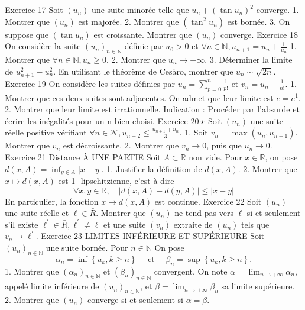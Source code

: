\documentclass[a4paper,11pt]{article}
\theoremstyle{definition}
\begin{document}
Exercice 17 Soit $\left(u_n\right)$ une suite minorée telle que $u_n+\left(\tan u_n\right)^2$ converge.
1. Montrer que $\left(u_n\right)$ est majorée.
2. Montrer que $\left(\tan ^2 u_n\right)$ est bornée.
3. On suppose que $\left(\tan u_n\right)$ est croissante. Montrer que $\left(u_n\right)$ converge.
Exercice 18 On considère la suite $\left(u_n\right)_{n \in \mathbb{N}}$ définie par $u_0>0$ et $\forall n \in \mathbb{N}, u_{n+1}=u_n+\frac{1}{u_n}$
1. Montrer que $\forall n \in \mathbb{N}, u_n \geq 0$.
2. Montrer que $u_n \rightarrow+\infty$.
3. Déterminer la limite de $u_{n+1}^2-u_n^2$. En utilisant le théorème de Cesàro, montrer que $u_n \sim \sqrt{2 n}$.
Exercice 19 On considère les suites définies par $u_n=\sum_{p=0}^n \frac{1}{p !}$ et $v_n=u_n+\frac{1}{n !}$.
1. Montrer que ces deux suites sont adjacentes.
On admet que leur limite est $e=e^1$.
2. Montrer que leur limite est irrationnelle.
Indication : Procéder par l'absurde et écrire les inégalités pour un n bien choisi.
Exercice $20 \star \operatorname{Soit}\left(u_n\right)$ une suite réelle positive vérifiant $\forall n \in \mathcal{N}, u_{n+2} \leq \frac{u_{n+1}+u_n}{3}$.
1. Soit $v_n=\max \left(u_n, u_{n+1}\right)$. Montrer que $v_n$ est décroissante.
2. Montrer que $v_n \rightarrow 0$, puis que $u_n \rightarrow 0$.
Exercice 21 Distance À UNE PARTIE Soit $A \subset \mathbb{R}$ non vide. Pour $x \in \mathbb{R}$, on pose $d(x, A)=\inf _{y \in A}|x-y|$.
1. Justifier la définition de $d(x, A)$.
2. Montrer que $x \mapsto d(x, A)$ est 1 -lipschitzienne, c'est-à-dire
$$
\forall x, y \in \mathbb{R}, \quad|d(x, A)-d(y, A)| \leq|x-y|
$$
En particulier, la fonction $x \mapsto d(x, A)$ est continue.
Exercice 22 Soit $\left(u_n\right)$ une suite réelle et $\ell \in \bar{R}$. Montrer que $\left(u_n\right)$ ne tend pas vers $\ell$ si et seulement s'il existe $\ell^{\prime} \in \bar{R}, \ell^{\prime} \neq \ell$ et une suite $\left(v_n\right)$ extraite de $\left(u_n\right)$ tels que $v_n \rightarrow \ell^{\prime}$.
Exercice 23 LIMITES INFÉRIEURE ET SUPÉRIEURE Soit $\left(u_n\right)_{n \in \mathbb{N}}$ une suite bornée. Pour $n \in \mathbb{N}$ On pose
$$
\alpha_n=\inf \left\{u_k, k \geq n\right\} \quad \text { et } \quad \beta_n=\sup \left\{u_k, k \geq n\right\} .
$$
1. Montrer que $\left(\alpha_n\right)_{n \in \mathbb{N}}$ et $\left(\beta_n\right)_{n \in \mathbb{N}}$ convergent. On note $\alpha=\lim _{n \rightarrow+\infty} \alpha_n$, appelé limite inférieure de $\left(u_n\right)_{n \in \mathbb{N}}$, et $\beta=\lim _{n \rightarrow+\infty} \beta_n$ sa limite supérieure.
2. Montrer que $\left(u_n\right)$ converge si et seulement si $\alpha=\beta$.
\end{document}
